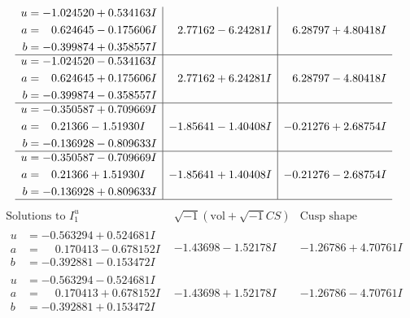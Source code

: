 \documentclass[1p]{elsarticle_modified}
\theoremstyle{definition}
\newcommand{\I}{\sqrt{-1}}
\begin{document}
$$\begin{array}{c|c|c}
\begin{aligned}
u &= -1.024520 + 0.534163 I \\
a &= \phantom{-}0.624645 - 0.175606 I \\
b &= -0.399874 + 0.358557 I\end{aligned}
 & \phantom{-}2.77162 - 6.24281 I & \phantom{-}6.28797 + 4.80418 I \\ \hline\begin{aligned}
u &= -1.024520 - 0.534163 I \\
a &= \phantom{-}0.624645 + 0.175606 I \\
b &= -0.399874 - 0.358557 I\end{aligned}
 & \phantom{-}2.77162 + 6.24281 I & \phantom{-}6.28797 - 4.80418 I \\ \hline\begin{aligned}
u &= -0.350587 + 0.709669 I \\
a &= \phantom{-}0.21366 - 1.51930 I \\
b &= -0.136928 - 0.809633 I\end{aligned}
 & -1.85641 - 1.40408 I & -0.21276 + 2.68754 I \\ \hline\begin{aligned}
u &= -0.350587 - 0.709669 I \\
a &= \phantom{-}0.21366 + 1.51930 I \\
b &= -0.136928 + 0.809633 I\end{aligned}
 & -1.85641 + 1.40408 I & -0.21276 - 2.68754 I\\
 \hline 
 \end{array}$$\newpage$$\begin{array}{c|c|c}  
\text{Solutions to }I^u_{1}& \I (\text{vol} + \sqrt{-1}CS) & \text{Cusp shape}\\
 \hline 
\begin{aligned}
u &= -0.563294 + 0.524681 I \\
a &= \phantom{-}0.170413 - 0.678152 I \\
b &= -0.392881 - 0.153472 I\end{aligned}
 & -1.43698 - 1.52178 I & -1.26786 + 4.70761 I \\ \hline\begin{aligned}
u &= -0.563294 - 0.524681 I \\
a &= \phantom{-}0.170413 + 0.678152 I \\
b &= -0.392881 + 0.153472 I\end{aligned}
 & -1.43698 + 1.52178 I & -1.26786 - 4.70761 I \\ \hline\begin{aligned}

\end{aligned}
\end{array}$$
\end{document}
